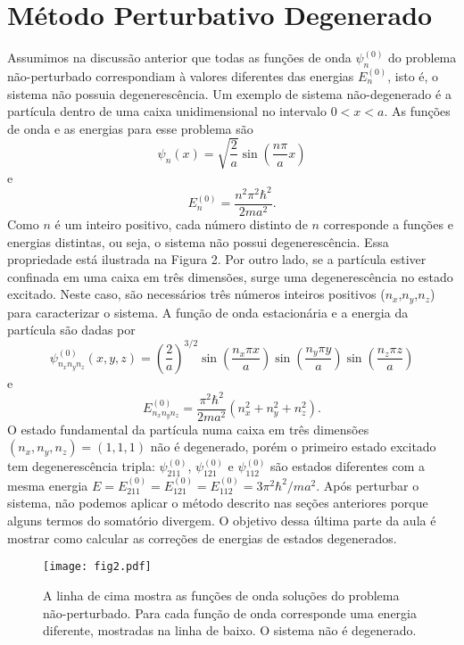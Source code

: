 \documentclass{article}
\begin{document}
\section{Método Perturbativo Degenerado}

Assumimos na discussão anterior que todas as funções de onda $\psi_{n}^{(0)}$ do problema não-perturbado correspondiam à valores diferentes das energias $E_n^{(0)}$, isto é, o sistema não possuia degenerescência. Um exemplo de sistema não-degenerado é a partícula dentro de uma caixa unidimensional no intervalo $0<x<a$. As funções de onda e as energias para esse problema são 
\begin{equation}
    \psi_n(x) = \sqrt{\frac{2}{a}}\sin\left( \frac{n\pi }{a}x \right)
\end{equation}
e
\begin{equation}
    E_n^{(0)} = \frac{n^2 \pi^2 \hbar^2}{2ma^2}.
\end{equation}
Como $n$ é um inteiro positivo, cada número distinto de $n$ corresponde a funções e energias distintas, ou seja, o sistema não possui degenerescência. Essa propriedade está ilustrada na Figura 2. Por outro lado, se a partícula estiver confinada em uma caixa em três dimensões, surge uma degenerescência no estado excitado. Neste caso, são necessários três números inteiros positivos ($n_x$,$n_y$,$n_z$) para caracterizar o sistema. A função de onda estacionária e a energia da partícula são dadas por
\begin{equation}
    \psi_{n_x n_y n_z}^{(0)}(x,y,z) = \left(\frac{2}{a}\right)^{3/2} \sin\left( \frac{n_x\pi x}{a} \right) \sin\left( \frac{n_y\pi y}{a} \right) \sin\left( \frac{n_z\pi z}{a} \right)
\end{equation}
e
\begin{equation}
    E_{n_x n_y n_z}^{(0)} = \frac{\pi^2 \hbar^2}{2ma^2}(n_x^2 + n_y^2 + n_z^2).
\end{equation}
O estado fundamental da partícula numa caixa em três dimensões $(n_x,n_y,n_z)=(1,1,1)$ não é degenerado, porém o primeiro estado excitado tem degenerescência tripla: $\psi_{211}^{(0)}$, $\psi_{121}^{(0)}$ e $\psi_{112}^{(0)}$ são estados diferentes com a mesma energia $E = E_{211}^{(0)} = E_{121}^{(0)} = E_{112}^{(0)} = 3\pi^2\hbar^2/ma^2$. Após perturbar o sistema, não podemos aplicar o método descrito nas seções anteriores porque alguns termos do somatório divergem. O objetivo dessa última parte da aula é mostrar como calcular as correções de energias de estados degenerados.

\begin{figure}[ht]
\centering
\texttt{[image: fig2.pdf]}
\caption{A linha de cima mostra as funções de onda soluções do problema não-perturbado. Para cada função de onda corresponde uma energia diferente, mostradas na linha de baixo. O sistema não é degenerado.}
\end{figure}
\end{document}
